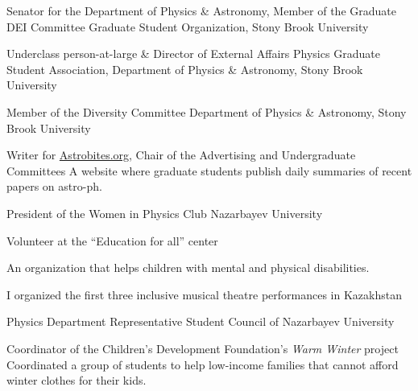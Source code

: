 \documentclass[10pt]{article} %
\begin{document}
\begin{paracol}{1}

	
	
	{Senator for the Department of Physics \& Astronomy, Member of the Graduate DEI Committee}
	{Graduate Student Organization, Stony Brook University}
	
	{Underclass person-at-large \& Director of External Affairs}
	{Physics Graduate Student Association, Department of Physics \& Astronomy, Stony Brook University}
	
	{Member of the Diversity Committee}
	{Department of Physics \& Astronomy, Stony Brook University}
	
	
	{Writer for \href{https://astrobites.org/author/ssagynbayeva/}{Astrobites.org}, Chair of the Advertising and Undergraduate Committees}
	{A website where graduate students publish daily summaries of recent papers on astro-ph.}

	
	
	
	{President of the Women in Physics Club}
	{Nazarbayev University}
	

	{Volunteer at the “Education for all” center}
	{An organization that helps children with mental and physical disabilities. 
	
	I organized the first three inclusive musical theatre performances in Kazakhstan}
	
	{Physics Department Representative}
	{Student Council of Nazarbayev University}

{Coordinator of the Children's Development Foundation's \textit{Warm Winter} project}
{Coordinated a group of students to help low-income families that cannot afford winter clothes for their kids.}




\end{paracol}
\end{document}
